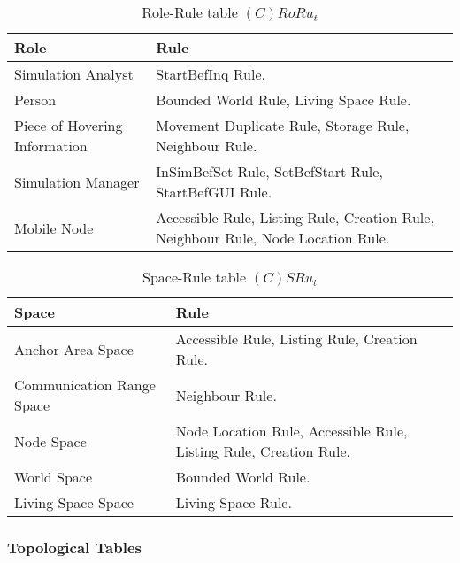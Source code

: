 \begin{table}[H]
	\centering
	\begin{tabular}{|p{4cm}|p{8cm}|}
			\hline
			\textbf{Role} & \textbf{Rule} \\
			\hline
			Simulation Analyst & StartBefInq Rule. \\
			\hline
			Person & Bounded World Rule, Living Space Rule. \\
			\hline
			Piece of Hovering Information &  Movement Duplicate
			Rule, Storage Rule, Neighbour Rule. \\
			\hline
			Simulation Manager & InSimBefSet Rule, SetBefStart Rule, StartBefGUI Rule. \\
			\hline
			Mobile Node & Accessible Rule, Listing Rule, Creation Rule, Neighbour
			Rule, Node Location Rule. \\
			\hline
		\end{tabular}
	\caption{Role-Rule table $(C)RoRu_t$}
	\label{tab:crorut}
\end{table}

\begin{table}[H]
	\centering
	\begin{tabular}{|p{4cm}|p{8cm}|}
			\hline
			\textbf{Space} & \textbf{Rule} \\
			\hline
			Anchor Area Space & Accessible Rule, Listing Rule, Creation Rule. \\
			\hline
			Communication Range Space & Neighbour Rule. \\
			\hline
			Node Space & Node Location Rule, Accessible Rule, Listing Rule, Creation Rule. \\
			\hline
			World Space & Bounded World Rule. \\
			\hline
			Living Space Space & Living Space Rule. \\
			\hline
		\end{tabular}
	\caption{Space-Rule table $(C)SRu_t$}
	\label{tab:cot}
\end{table}

\subsubsection{Topological Tables}

